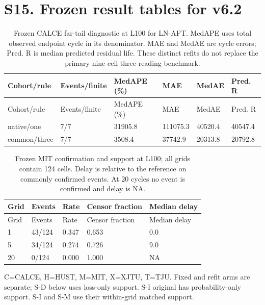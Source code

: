 \clearpage\section*{S15. Frozen result tables for v6.2}

\begin{longtable}{llllll}
\caption{Frozen CALCE far-tail diagnostic at L100 for LN-AFT. MedAPE uses total observed endpoint cycle in its denominator. MAE and MedAE are cycle errors; Pred. R is median predicted residual life. These distinct refits do not replace the primary nine-cell three-reading benchmark.}\label{tab:v62_calce}\\
\toprule
Cohort/rule & Events/finite & MedAPE (\%) & MAE & MedAE & Pred. R\\\midrule\endfirsthead
Cohort/rule & Events/finite & MedAPE (\%) & MAE & MedAE & Pred. R\\\midrule\endhead
native/one & 7/7 & 31905.8 & 111075.3 & 40520.4 & 40547.4\\
common/three & 7/7 & 3508.4 & 37742.9 & 20313.8 & 20792.8\\
\bottomrule\end{longtable}

\begin{longtable}{lllll}
\caption{Frozen MIT confirmation and support at L100; all grids contain 124 cells. Delay is relative to the reference on commonly confirmed events. At 20 cycles no event is confirmed and delay is NA.}\label{tab:v62_grid}\\
\toprule
Grid & Events & Rate & Censor fraction & Median delay\\\midrule\endfirsthead
Grid & Events & Rate & Censor fraction & Median delay\\\midrule\endhead
1 & 43/124 & 0.347 & 0.653 & 0.0\\
5 & 34/124 & 0.274 & 0.726 & 9.0\\
20 & 0/124 & 0.000 & 1.000 & NA\\
\bottomrule\end{longtable}

\small C=CALCE, H=HUST, M=MIT, X=XJTU, T=TJU. Fixed and refit arms are separate; S-D below uses loss-only support. S-I original has probability-only support. S-I and S-M use their within-grid matched support.


